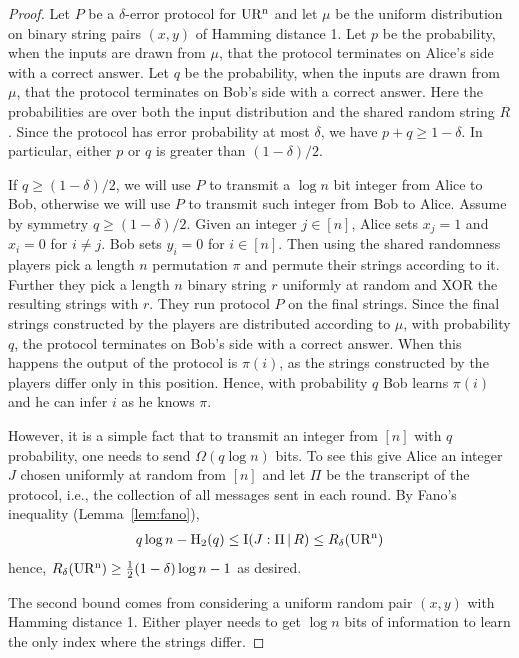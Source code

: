 \begin{proof}

Let $P$ be a $\delta$-error protocol for 
$\operatorname{UR^n}$ and let $\mu$ be the uniform 
distribution on binary string pairs $(x,y)$ 
of Hamming distance 1. Let $p$ be the 
probability, when the inputs are drawn from 
$\mu$, that the protocol terminates on 
Alice's side with a correct answer. Let $q$ 
be the probability, when the inputs are drawn 
from $\mu$, that the protocol terminates on 
Bob's side with a correct answer. Here the 
probabilities are over both the input 
distribution and the shared random string 
$R$. Since the protocol has error probability 
at most $\delta$, we have $p+q\geq 1-\delta$. 
In particular, either $p$ or $q$ is greater 
than $(1-\delta)/2$.

If $q\geq (1-\delta)/2$, we will use $P$ to 
transmit a $\log n$ bit integer from Alice to 
Bob, otherwise we will use $P$ to transmit 
such integer from Bob to Alice. Assume by 
symmetry $q\geq (1-\delta)/2$. Given an 
integer $j\in[n]$, Alice sets $x_j=1$ and 
$x_i=0$ for $i\neq j$. Bob sets $y_i=0$ for 
$i\in[n]$. Then using the shared randomness 
players pick a length $n$ permutation $\pi$ 
and permute their strings according to it. 
Further they pick a length $n$ binary string 
$r$ uniformly at random and XOR the resulting 
strings with $r$. They run protocol $P$ on 
the final strings. Since the final strings 
constructed by the players are distributed 
according to $\mu$, with probability $q$, the 
protocol terminates on Bob's side with a 
correct answer. When this happens the output 
of the protocol is $\pi(i)$, as the strings 
constructed by the players differ only in 
this position. Hence, with probability $q$ 
Bob learns $\pi(i)$ and he can infer $i$ 
as he knows $\pi$.

However, it is a simple fact that to transmit 
an integer from $[n]$ with $q$  probability, 
one needs to send $\Omega(q\log n)$ bits. To 
see this give Alice an integer $J$ chosen 
uniformly at random from $[n]$ and let $\Pi$ 
be the transcript of the protocol, i.e., the 
collection of all messages sent in each 
round. By Fano's inequality 
(Lemma~\ref{lem:fano}), 
\begin{align*}
q\log n - \operatorname*{H_2}(q)\leq 
\operatorname*{I}(J:\Pi\,|\, R)\leq R_\delta(\operatorname{UR^n})
\end{align*}
hence, $R_\delta(\operatorname{UR^n})\geq \frac{1}{2}
(1-\delta)\log n -1$ as desired.

The second bound comes from considering a uniform random pair $(x,y)$ with
Hamming distance 1. Either player needs to get $\log n$ bits of information to
learn the only index where the strings differ.


\end{proof}
